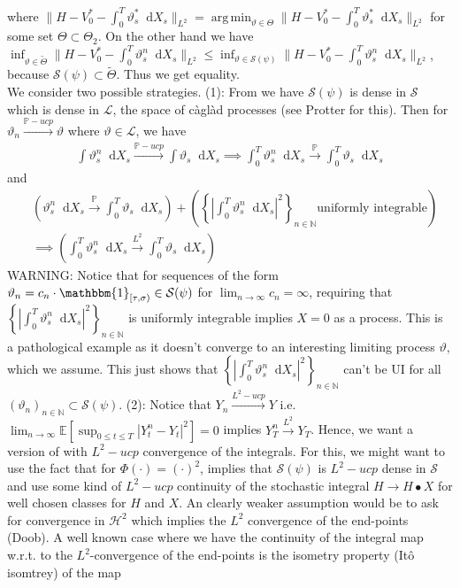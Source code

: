 \documentclass[11pt]{report}
\newcommand{\diff}{\mathop{}\!\mathrm{d}}
\DeclareMathOperator*{\argmin}{arg\,min}
\theoremstyle{plain} %
\theoremstyle{definition} %
\theoremstyle{remark} %
\begin{document}
where \(\lVert H-V_0^*-\int_0^T \vartheta_s^*\diff X_s\rVert_{L^2}=\argmin_{\vartheta\in\Theta}\lVert H-V_0^*-\int_0^T \vartheta_s^*\diff X_s\rVert_{L^2}\) for some set \(\Theta\subset\Theta_2\). On the other hand we have \(\inf_{\vartheta\in\tilde{\Theta}}\lVert H-V_0^*-\int_0^T \vartheta_s^n\diff X_s\rVert_{L^2}\leq\inf_{\vartheta\in\mathcal{S}(\psi)}\lVert H-V_0^*-\int_0^T \vartheta_s^n\diff X_s\rVert_{L^2}\), because \(\mathcal{S}(\psi)\subset\tilde{\Theta}\). Thus we get equality. \\
We consider two possible strategies.
\bigbreak
(1): From \parencite[Thm~5.29.]{Arandjelovic2025} we have \(\mathcal{S}(\psi)\) is dense in \(\mathcal{S}\) which is dense in \(\mathcal{L}\), the space of càglàd processes (see Protter for this). Then for \(\vartheta_n\overset{\mathbb{P}-ucp}{\to}\vartheta\) where \(\vartheta\in \mathcal{L}\), we have 
\begin{align*}
    \int \vartheta_s^n\diff X_s\overset{\mathbb{P}-ucp}{\to}\int \vartheta_s\diff X_s\implies\int_0^T \vartheta_s^n\diff X_s\overset{\mathbb{P}}{\to}\int_0^T\vartheta_s\diff X_s
\end{align*}
and 
\begin{align*}
    &\left(\vartheta_s^n\diff X_s\overset{\mathbb{P}}{\to}\int_0^T\vartheta_s\diff X_s \right) + \left(\left\{\left|\int_{0}^T\vartheta_s^{n}\diff X_s\right|^2\right\}_{n\in\mathbb{N}}\text{uniformly integrable}\right)\\&\implies \left(\int_0^T\vartheta_s^n\diff X_s\overset{L^2}{\to}\int_0^T\vartheta_s\diff X_s \right)
\end{align*}
WARNING: Notice that for sequences of the form \(\vartheta_n=c_n\cdot\mathbbm{1}_{[\tau,\sigma)}\in\mathcal{S}(\psi)\) for \(\lim_{n\to\infty}c_n=\infty\), requiring that \(\left\{\left|\int_{0}^T\vartheta_s^{n}\diff X_s\right|^2\right\}_{n\in\mathbb{N}}\) is uniformly integrable implies \(X=0\) as a process. This is a pathological example as it doesn't converge to an interesting limiting process \(\vartheta\), which we assume. This just shows that  \(\left\{\left|\int_{0}^T\vartheta_s^{n}\diff X_s\right|^2\right\}_{n\in\mathbb{N}}\) can't be UI for all \((\vartheta_n)_{n\in\mathbb{N}}\subset\mathcal{S}(\psi)\). 
\bigbreak
(2): Notice that \(Y_n\overset{L^2-ucp}{\to}Y\) i.e. \(\lim_{n\to\infty}\mathbb{E}[\sup_{0\leq t\leq T}|Y_t^n-Y_t|^2]=0\) implies \(Y^n_T\overset{L^2}{\to}Y_T\). Hence, we want a version of \parencite[Thm~5.29]{Arandjelovic2025} with \(L^2-ucp\) convergence of the integrals. For this, we might want to use the fact that for \(\Phi(\cdot)=(\cdot)^2\), \parencite[Thm~5.28]{Arandjelovic2025} implies that \(\mathcal{S}(\psi)\) is \(L^2-ucp\) dense in \(\mathcal{S}\) and use some kind of \(L^2-ucp\) continuity of the stochastic integral \(H\to H\bullet X\) for well chosen classes for \(H\) and \(X\). An clearly weaker assumption would be to ask for convergence in \(\mathcal{H}^2\) which implies the \(L^2\) convergence of the end-points (Doob). A well known case where we have the continuity of the integral map w.r.t. to the \(L^2\)-convergence of the end-points is the isometry property (Itô isomtrey) of the map 
\end{document}
